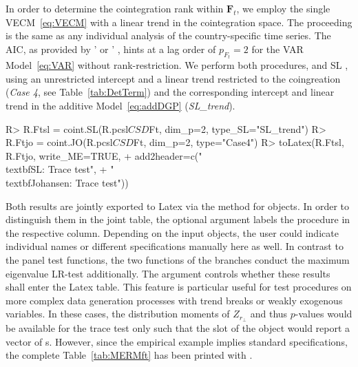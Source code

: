 In order to determine the cointegration rank within $ \boldsymbol{F}_{t} $, we employ the single VECM~\eqref{eq:VECM} with a linear trend in the cointegration space. The proceeding is the same as any individual analysis of the country-specific time series. The AIC, as provided by '  or ' , hints at a lag order of $ p_{F_t}=2 $ for the VAR Model~\eqref{eq:VAR} without rank-restriction.
We perform both procedures, \citet{Johansen1996} and SL \citeyearpar{SaikkonenLutkepohl2000c}, using an unrestricted intercept and a linear trend restricted to the coingreation (\textit{Case 4}, see Table~\ref{tab:DetTerm}) and the corresponding intercept and linear trend in the additive Model~\eqref{eq:addDGP} (\textit{SL\_trend}).
\begin{CodeChunk}
\begin{CodeInput}
R> R.Ftsl = coint.SL(R.pcsl$CSD$Ft, dim_p=2, type_SL="SL_trend")
R> R.Ftjo = coint.JO(R.pcsl$CSD$Ft, dim_p=2, type="Case4")
R> toLatex(R.Ftsl, R.Ftjo, write_ME=TRUE, 
+     add2header=c("\\textbf{SL:} Trace test", 
+                  "\\textbf{Johansen:} Trace test"))
\end{CodeInput}
\end{CodeChunk}
Both results are jointly exported to Latex via the  method for  objects. In order to distinguish them in the joint table, the optional argument  labels the procedure in the respective column. Depending on the input  objects, the user could indicate individual names or different specifications manually here as well. In contrast to the panel test functions, the two functions of the  branches conduct the maximum eigenvalue LR-test additionally. The argument  controls whether these results shall enter the Latex table. This feature is particular useful for test procedures on more complex data generation processes with trend breaks or weakly exogenous variables. In these cases, the distribution moments of $ Z_{r_\perp} $ and thus $p$-values would be available for the trace test only such that the slot  of the  object would report a vector of s. However, since the empirical example implies standard specifications, the complete Table~\ref{tab:MERMft} has been printed with .
 
